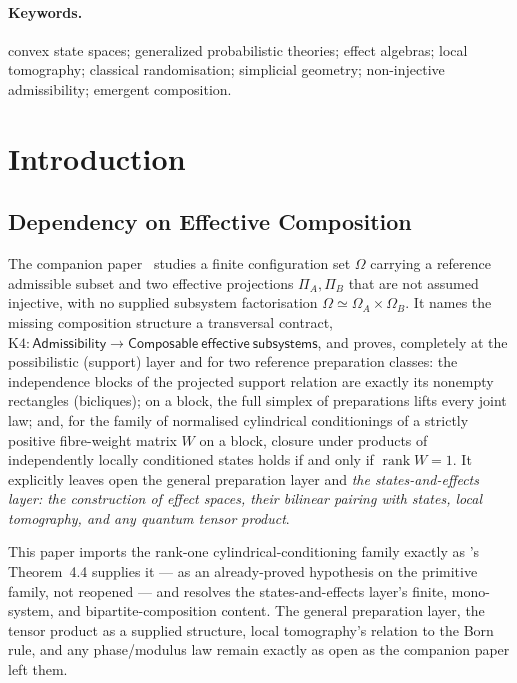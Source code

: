 \documentclass[11pt,a4paper]{article}
\newcommand{\rk}{\operatorname{rank}}
\begin{document}
  \paragraph{Keywords.}
    convex state spaces; generalized probabilistic theories; effect algebras; local tomography; classical
    randomisation; simplicial geometry; non-injective admissibility; emergent composition.

    \clearpage
    \tableofcontents

    \clearpage
  \section{Introduction}
  \label{sec:intro}

  \subsection{Dependency on Effective Composition}
    \label{ssec:dependency}

    The companion paper~\cite{Beau2026esub} studies a finite configuration set $\Omega$ carrying a reference
    admissible subset and two effective projections $\Pi_A, \Pi_B$ that are not assumed injective, with no
    supplied subsystem factorisation $\Omega \simeq \Omega_A \times \Omega_B$.
    It names the missing composition structure a transversal contract,
    $\mathrm{K4} \colon \mathsf{Admissibility} \to \mathsf{Composable\ effective\ subsystems}$, and proves,
    completely at the possibilistic (support) layer and for two reference preparation classes: the
    independence blocks of the projected support relation are exactly its nonempty rectangles (bicliques);
    on a block, the full simplex of preparations lifts every joint law; and, for the family of normalised
    cylindrical conditionings of a strictly positive fibre-weight matrix $W$ on a block, closure under
    products of independently locally conditioned states holds if and only if $\rk W = 1$.
    It explicitly leaves open the general preparation layer and \emph{the states-and-effects layer: the
    construction of effect spaces, their bilinear pairing with states, local tomography, and any quantum
    tensor product}.

    This paper imports the rank-one cylindrical-conditioning family exactly as
    \cite{Beau2026esub}'s Theorem~4.4 supplies it --- as an already-proved hypothesis on the primitive family,
    not reopened --- and resolves the states-and-effects layer's finite, mono-system, and
    bipartite-composition content.
    The general preparation layer, the tensor product as a supplied structure, local tomography's relation
    to the Born rule, and any phase/modulus law remain exactly as open as the companion paper left them.
\end{document}
